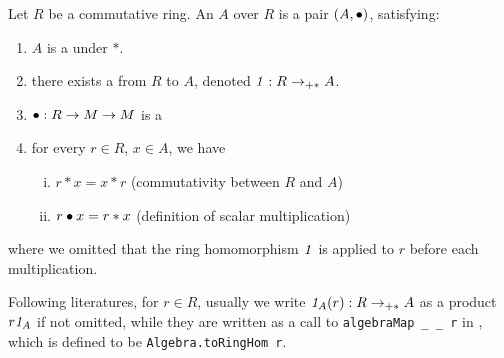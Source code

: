 \begin{definition}[Algebra]
    \label{Algebra}
    \leanok

    Let $R$ be a commutative ring. An  $A$ over $R$ is a pair $(A, \bullet)$, satisfying:

    \begin{enumerate}
    \item $A$ is a  under $*$.
    
    \item there exists a  from $R$ to $A$, denoted $\mathit{1} : R \to_{+*} A$.
    
    \item $\bullet : R \to M \to M$ is a 
    
    \item for every $r \in R$, $x \in A$, we have

    \begin{enumerate}[(i)]
        \item $r * x = x * r$ (commutativity between $R$ and $A$)
        \item $r \bullet x = r * x$ (definition of scalar multiplication)
    \end{enumerate}

    \end{enumerate}

    where we omitted that the ring homomorphism $\mathit{1}$ is applied to $r$ before each multiplication.

\end{definition}

\begin{remark}
    \label{mk:AlgebraNotation}

    Following literatures, for $r \in R$, 
    usually we write $\mathit{1}_A(r) : R \to_{+*} A$ as a product $r \mathit{1}_A$ if not omitted,
    while they are written as a call to \lstinline|algebraMap _ _ r| in \Mathlib,
    which is defined to be \lstinline|Algebra.toRingHom r|.

\end{remark}

